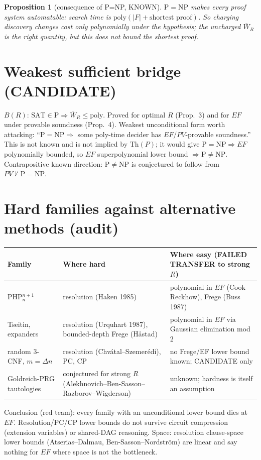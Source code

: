 \documentclass{article}
\newtheorem{prop}{Proposition}
\begin{document}
\begin{prop}[consequence of P=NP, KNOWN] $\mathrm P=\mathrm{NP}$ makes every proof system automatable: search time is $\mathrm{poly}(|F|+\text{shortest proof})$. So charging discovery changes cost only polynomially under the hypothesis; the uncharged $\overline W_R$ is the right quantity, but this does not bound the shortest proof.\end{prop}

\section{Weakest sufficient bridge (CANDIDATE)}
$B(R)$: $\mathrm{SAT}\in\mathrm P\Rightarrow\overline W_R\le\mathrm{poly}$. Proved for optimal $R$ (Prop.~3) and for $EF$ under provable soundness (Prop.~4). Weakest unconditional form worth attacking: ``$\mathrm P=\mathrm{NP}\Rightarrow$ some poly-time decider has $EF$/$PV$-provable soundness.'' This is not known and is not implied by $\mathrm{Th}(P)$; it would give $\mathrm{P}=\mathrm{NP}\Rightarrow EF$ polynomially bounded, so $EF$ superpolynomial lower bound $\Rightarrow\mathrm P\ne\mathrm{NP}$. Contrapositive known direction: $\mathrm P\ne\mathrm{NP}$ is conjectured to follow from $PV\nvdash\mathrm P=\mathrm{NP}$.

\section{Hard families against alternative methods (audit)}
\begin{tabular}{lll}
Family & Where hard & Where easy (FAILED TRANSFER to strong $R$)\\ \hline
PHP$_n^{n+1}$ & resolution (Haken 1985) & polynomial in $EF$ (Cook--Reckhow), Frege (Buss 1987)\\
Tseitin, expanders & resolution (Urquhart 1987), bounded-depth Frege (Håstad) & polynomial in $EF$ via Gaussian elimination mod 2\\
random 3-CNF, $m=\Delta n$ & resolution (Chvátal--Szemerédi), PC, CP & no Frege/EF lower bound known; CANDIDATE only\\
Goldreich-PRG tautologies & conjectured for strong $R$ (Alekhnovich--Ben-Sasson--Razborov--Wigderson) & unknown; hardness is itself an assumption\\
\end{tabular}

\noindent Conclusion (red team): every family with an unconditional lower bound dies at $EF$. Resolution/PC/CP lower bounds do not survive circuit compression (extension variables) or shared-DAG reasoning. Space: resolution clause-space lower bounds (Atserias--Dalmau, Ben-Sasson--Nordström) are linear and say nothing for $EF$ where space is not the bottleneck.
\end{document}
